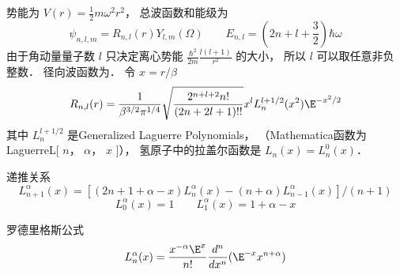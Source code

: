 

势能为 $V(r) = \frac{1}{2}m{\omega ^2}{r^2}$，  总波函数和能级为
\begin{equation}
{\psi _{n,l,m}} = {R_{n,l}}(r){Y_{l,m}}(\Omega )
\qquad
{E_{n,l}} = \left( {2n + l + \frac{3}{2}} \right)\hbar \omega 
\end{equation}    
由于角动量量子数 $l$ 只决定离心势能 $\frac{{{\hbar ^2}}}{{2m}}\frac{{l(l + 1)}}{{{r^2}}}$  的大小， 所以 $l$ 可以取任意非负整数． 径向波函数为． 令 $x = r/\beta $
 \begin{equation}
{R_{n,l}}(r) = \frac{1}{{{\beta ^{3/2}}{\pi ^{1/4}}}}\sqrt {\frac{{{2^{n + l + 2}}n!}}{{(2n + 2l + 1)!!}}} {x^l}L_n^{l + 1/2}({x^2}){\E^{ - {x^2}/2}}
\end{equation}
其中 $L_n^{l + 1/2}$ 是Generalized Laguerre Polynomials， （Mathematica函数为
LaguerreL[ $n$， $\alpha $，   $x$ ]）， 氢原子中的拉盖尔函数是 ${L_n}(x) = L_n^0(x)$． 

递推关系
 \begin{equation}
L_{n + 1}^\alpha (x) = [(2n + 1 + \alpha  - x)L_n^\alpha (x) - (n + \alpha )L_{n - 1}^\alpha (x)]/(n + 1)
\end{equation}
\begin{equation}
L_0^\alpha (x) = 1
\qquad
L_1^\alpha (x) = 1 + \alpha  - x
\end{equation}
    
罗德里格斯公式
 \begin{equation}
L_n^\alpha (x) = \frac{{{x^{ - \alpha }}{\E^x}}}{{n!}}\frac{{{d^n}}}{{d{x^n}}}({\E^{ - x}}{x^{n + \alpha }})
\end{equation}

